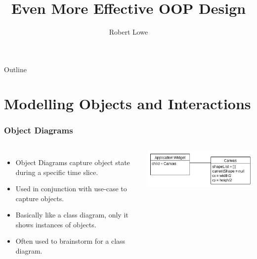 \documentclass{beamer}
\title{Even More Effective OOP Design}
\author{Robert Lowe\\}
\institute[Maryville College] %
{
  Division of Mathematics and Computer Science\\
  Maryville College
}
\date[]{}
\begin{document}
\begin{frame}
  \titlepage
\end{frame}

\begin{frame}{Outline}
  \tableofcontents
\end{frame}





\section{Modelling Objects and Interactions}
\begin{frame}
    \frametitle{Object Diagrams}
    \begin{columns}
    \begin{itemize}[<+->]
        \item Object Diagrams capture object state during a specific
            time slice.
        \item Used in conjunction with use-case to capture objects.
        \item Basically like a class diagram, only it shows instances
            of objects.
        \item Often used to brainstorm for a class diagram.
    \end{itemize}
    \includegraphics[width=\textwidth]{images/shapesObject}
    \end{columns}
\end{frame}
\end{document}
